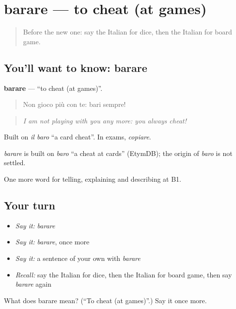 \section[barare]{barare — to cheat (at games)}

\label{lesson:IT-C503-barare}



\begin{quote}
Before the new one: say the Italian for dice, then the Italian for board game.
\end{quote}

\subsection*{You'll want to know: barare}
\textbf{barare} — \textquotedblleft{}to cheat (at games)\textquotedblright{}.

\begin{quote}
Non gioco più con te: bari sempre!
\end{quote}

\begin{quote}
\emph{I am not playing with you any more: you always cheat!}
\end{quote}

Built on \emph{il baro} \textquotedblleft{}a card cheat\textquotedblright{}. In exams, \emph{copiare}.

\begin{cousinweb}
\emph{barare} is built on \emph{baro} \textquotedblleft{}a cheat at cards\textquotedblright{} (EtymDB); the origin of \emph{baro} is not settled.
\end{cousinweb}

\begin{grammarlens}[title={What you've built}]
One more word for telling, explaining and describing at B1.
\end{grammarlens}

\subsection*{Your turn}
\begin{itemize}
\raggedright
  \item \emph{Say it:} \emph{barare}
  \item \emph{Say it:} \emph{barare}, once more
  \item \emph{Say it:} a sentence of your own with \emph{barare}
  \item \emph{Recall:} say the Italian for dice, then the Italian for board game, then say \emph{barare} again
\end{itemize}

\begin{tcolorbox}[breakable,colback=teal!4,colframe=teal!35!black,title={Before you move on}]
What does barare mean? (\textquotedblleft{}To cheat (at games)\textquotedblright{}.) Say it once more.
\end{tcolorbox}
